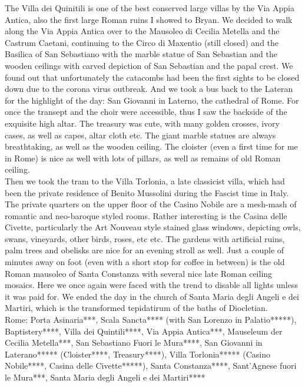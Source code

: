 The Villa dei Quinitili is one of the best conserved large villas by the Via Appia Antica, also the first large Roman ruins I showed to Bryan. We decided to walk along the Via Appia Antica over to the Mausoleo di Cecilia Metella and the Castrum Caetani, continuing to the Circo di Maxentio (still closed) and the Basilica of San Sebastiano with the marble statue of San Sebastian and the wooden ceilings with carved depiction of San Sebastian and the papal crest. We found out that unfortunately the catacombs had been the first sights to be closed down due to the corona virus outbreak. And we took a bus back to the Lateran for the highlight of the day: San Giovanni in Laterno, the cathedral of Rome. For once the transept and the choir were accessible, thus I saw the backside of the exquisite high altar. The treasury was cute, with many golden crosses, ivory cases, as well as capes, altar cloth etc. The giant marble statues are always breathtaking, as well as the wooden ceiling. The cloister (even a first time for me in Rome) is nice as well with lots of pillars, as well as remains of old Roman ceiling.\\
Then we took the tram to the Villa Torlonia, a late classicist villa, which had been the private residence of Benito Mussolini during the Fascist time in Italy. The private quarters on the upper floor of the Casino Nobile are a mesh-mash of romantic and neo-baroque styled rooms. Rather interesting is the Casina delle Civette, particularly the Art Nouveau style stained glass windows, depicting owls, swans, vineyards, other birds, roses, etc etc. The gardens with artificial ruins, palm trees and obelisks are nice for an evening stroll as well. Just a couple of minutes away on foot (even with a short stop for coffee in between) is the old Roman mausoleo of Santa Constanza with several nice late Roman ceiling mosaics. Here we once again were faced with the trend to disable all lights unless it was paid for. We ended the day in the church of Santa Maria degli Angeli e dei Martiri, which is the transformed tepidatirum of the baths of Diocletian.\\

Rome: Porta Asinaria***, Scala Sancta**** (with San Lorenzo in Palatio*****), Baptistery****, Villa dei Quintili****, Via Appia Antica***, Mauseleum der Cecilia Metella***, San Sebastiano Fuori le Mura****, San Giovanni in Laterano***** (Cloister****, Treasury****), Villa Torlonia***** (Casino Nobile****, Casina delle Civette*****), Santa Constanza****, Sant'Agnese fuori le Mura***, Santa Maria degli Angeli e dei Martiri****\\%

